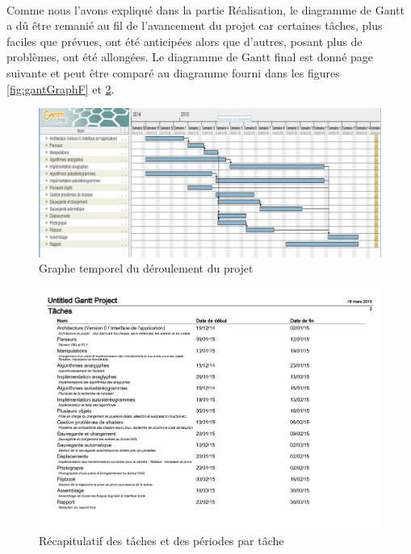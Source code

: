 \paragraph{}
Comme nous l'avons expliqué dans la partie Réalisation, le diagramme de Gantt a dû être remanié au fil de l'avancement du projet car certaines tâches, plus faciles que prévues, ont été anticipées alors que d'autres, posant plus de problèmes, ont été allongées.
Le diagramme de Gantt final est donné page suivante et peut être comparé au diagramme fourni dans les figures \ref{fig:gantGraphF} et \ref{fig:gantF}.

\newpage
\begin{figure}[h]
	\centering
        \begin{sideways}
                \includegraphics[scale=0.42]{graphGantF.jpg}
        \end{sideways}
	\caption{\label{fig:graphGantF} Graphe temporel du déroulement du projet \protect \footnotemark }
\end{figure}

\begin{figure}[h]
	\centering
	\includegraphics[scale=0.6]{gantf.pdf}
	\caption{\label{fig:gantF} Récapitulatif des tâches et des périodes par tâche \protect \footnotemark }
\end{figure}

